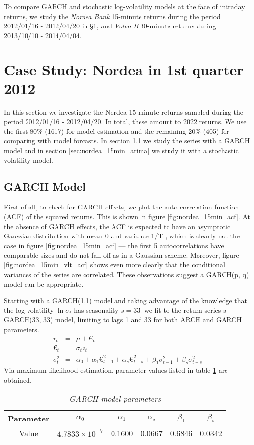 To compare GARCH and stochastic log-volatility models at the face of
intraday returns, we study the {\it Nordea Bank} 15-minute returns
during the period 2012/01/16 - 2012/04/20 in \S\ref{chp:nordea_15min},
and {\it Volvo B} 30-minute returns during 2013/10/10 - 2014/04/04.

\section{Case Study: Nordea in 1st quarter 2012}
\label{chp:nordea_15min}
In this section we investigate the Nordea 15-minute returns sampled
during the period 2012/01/16 - 2012/04/20. In total, these amount to
2022 returns. We use the first 80\% (1617) for model estimation and  the
remaining 20\% (405) for comparing with model forcasts. In section
\ref{sec:nordea_15min_garch} we study the series with a GARCH model 
and in section \ref{sec:nordea_15min_arima} we study it with a
stochastic volatility model.

\subsection{GARCH Model}\label{sec:nordea_15min_garch}
First of all, to check for GARCH effects, we plot the auto-correlation
function (ACF) of the squared returns. This is shown in figure
\ref{fig:nordea_15min_acf}. At the absence of GARCH effects, the ACF
is expected to have an asymptotic Gaussian distribution with mean 0
and variance 1/T \cite{Bollerslev86, Bollerslev87}, which is clearly
not the case in figure \ref{fig:nordea_15min_acf} --- the first 5
autocorrelations have comparable sizes and do not fall off as in a
Gaussian scheme. Moreover, figure \ref{fig:nordea_15min_vlt_acf} shows
even more clearly that the conditional variances of the series are
correlated. These observations suggest a GARCH(p, q) model can be
appropriate.

Starting with a GARCH(1,1) model and taking advantage of the knowledge
that the log-volatility $\ln \sigma_t$ has seasonality $s=33$, we fit
to the return series a GARCH(33, 33) model, limiting to lags 1 and 33
for both ARCH and GARCH parameters.
\begin{eqnarray*}
  r_t &=& \mu + €_t \\
  €_t &=& \sigma_t z_t \\
  \sigma^2_t &=& \alpha_0 + \alpha_1 €^2_{t-1} + \alpha_s €^2_{t-s} +
  \beta_1 \sigma^2_{t-1} + \beta_s \sigma^2_{t-s}
\end{eqnarray*}
Via maximum likelihood estimation, parameter values listed in table
\ref{tab:nordea_15min_garch} are obtained.
\begin{table}[htb!]
  \centering
  \begin{tabular}{|c|c|c|c|c|c|}
    \hline
    Parameter & $\alpha_0$ & $\alpha_1$ & $\alpha_s$ & $\beta_1$ &
    $\beta_s$ \\
    \hline
    Value & $4.7833 \times 10^{-7}$ & 0.1600 & 0.0667 & 0.6846 &
    0.0342 \\
    \hline
  \end{tabular}
  \caption{\small \it GARCH model parameters}
  \label{tab:nordea_15min_garch}
\end{table}


